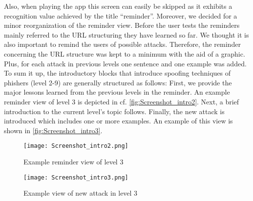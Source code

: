 Also, when playing the app this screen can easily be skipped as it exhibits a recognition value achieved by the title ``reminder''. 
Moreover, we decided for a minor reorganization of the reminder view. 
Before the user tests the reminders mainly referred to the URL structuring they have learned so far. 
We thought it is also important to remind the users of possible attacks. 
Therefore, the reminder concerning the URL structure was kept to a minimum with the aid of a graphic. 
Plus, for each attack in previous levels one sentence and one example was added.  
To sum it up, the introductory blocks that introduce spoofing techniques of phishers (level 2-9) are generally structured as follows:
First, we provide the major lessons learned from the previous levels in the reminder.
An example reminder view of level 3 is depicted in  cf. \autoref{fig:Screenshot_intro2}.
Next, a brief introduction to the current level's topic follows.
Finally, the new attack is introduced which includes one or more examples.
An example of this view is shown in \autoref{fig:Screenshot_intro3}.

\begin{figure}[hHtbp]
\centering
\texttt{[image: Screenshot\_intro2.png]}
\caption{Example reminder view of level 3}
\label{fig:Screenshot_intro2}
\end{figure}


\begin{figure}[hHtbp]
\centering
\texttt{[image: Screenshot\_intro3.png]}
\caption{Example view of new attack in level 3}
\label{fig:Screenshot_intro3}
\end{figure}


